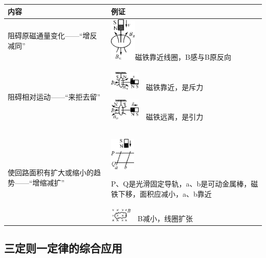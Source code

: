 \documentclass[cn,10.5pt,chinese,mac,chinesefont=founder]{elegantbook}
\begin{document}
\begin{longtable}[]{@{}m{3cm}m{7cm}@{}}
\toprule
内容 & 例证\tabularnewline
\midrule
\endhead

阻碍原磁通量变化------``增反减同''
& \begin{minipage}[t]{0.47\columnwidth}\raggedright
\includegraphics[width=0.49028in,height=0.82083in]{media/image392.png}磁铁靠近线圈，B感与B原反向\strut
\end{minipage}\tabularnewline

阻碍相对运动------``来拒去留''
& \begin{minipage}[t]{0.47\columnwidth}\raggedright
\includegraphics[width=0.56597in,height=0.36806in]{media/image393.png}　磁铁靠近，是斥力

\includegraphics[width=0.56597in,height=0.40556in]{media/image394.png}　磁铁远离，是引力\strut
\end{minipage}\tabularnewline
\multirow{2}{3cm}{使回路面积有扩大或缩小的趋势------``增缩减扩''}
& \begin{minipage}[t]{0.47\columnwidth}\raggedright

	\includegraphics[width=0.47153in,height=0.62292in]{media/image395.png}

P、Q是光滑固定导轨，a、b是可动金属棒，磁铁下移，面积应减小，a、b靠近\strut
\end{minipage}\tabularnewline
&
\includegraphics[width=0.39653in,height=0.25486in]{media/image396.png}　B减小，线圈扩张\tabularnewline
\bottomrule
\end{longtable}


\subsection{三定则一定律的综合应用}
\end{document}
